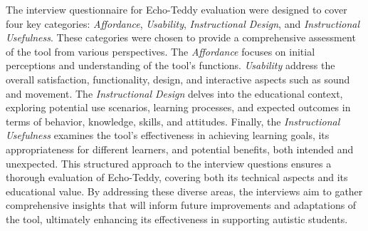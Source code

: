 The interview questionnaire for Echo-Teddy evaluation were designed to cover four key categories: \textit{Affordance}, \textit{Usability}, \textit{Instructional Design}, and \textit{Instructional Usefulness}. These categories were chosen to provide a comprehensive assessment of the tool from various perspectives. The \textit{Affordance} focuses on initial perceptions and understanding of the tool's functions. \textit{Usability} address the overall satisfaction, functionality, design, and interactive aspects such as sound and movement. The \textit{Instructional Design} delves into the educational context, exploring potential use scenarios, learning processes, and expected outcomes in terms of behavior, knowledge, skills, and attitudes. Finally, the \textit{Instructional Usefulness} examines the tool's effectiveness in achieving learning goals, its appropriateness for different learners, and potential benefits, both intended and unexpected. This structured approach to the interview questions ensures a thorough evaluation of Echo-Teddy, covering both its technical aspects and its educational value. By addressing these diverse areas, the interviews aim to gather comprehensive insights that will inform future improvements and adaptations of the tool, ultimately enhancing its effectiveness in supporting autistic students.

